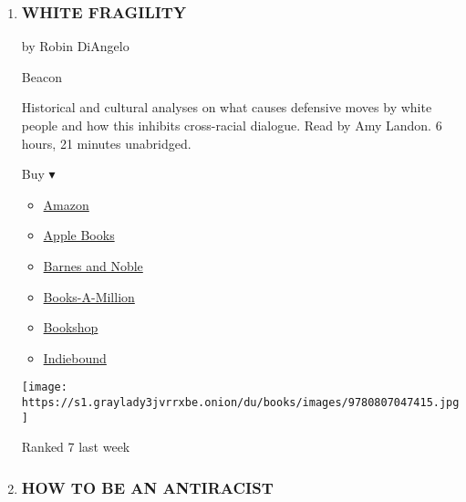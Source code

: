 \begin{enumerate}
\def\labelenumi{\arabic{enumi}.}
\item
  \hypertarget{white-fragility}{%
  \subsubsection{WHITE FRAGILITY}\label{white-fragility}}

  by Robin DiAngelo

  Beacon

  Historical and cultural analyses on what causes defensive moves by
  white people and how this inhibits cross-racial dialogue. Read by Amy
  Landon. 6 hours, 21 minutes unabridged.

  Buy ▾

  \begin{itemize}
  \tightlist
  \item
    \href{https://www.amazon.com/White-Fragility-People-About-Racism/dp/0807047414?tag=NYTBS-20}{Amazon}
  \item
    \href{https://du-gae-books-dot-nyt-du-prd.appspot.com/buy?title=WHITE+FRAGILITY\&author=Robin+DiAngelo}{Apple
    Books}
  \item
    \href{https://www.anrdoezrs.net/click-7990613-11819508?url=https\%3A\%2F\%2Fwww.barnesandnoble.com\%2Fw\%2F\%3Fean\%3D9780807032596}{Barnes
    and Noble}
  \item
    \href{https://www.anrdoezrs.net/click-7990613-35140?url=https\%3A\%2F\%2Fwww.booksamillion.com\%2Fp\%2FWHITE\%2BFRAGILITY\%2FRobin\%2BDiAngelo\%2F9780807032596}{Books-A-Million}
  \item
    \href{https://bookshop.org/a/3546/9780807032596}{Bookshop}
  \item
    \href{https://www.indiebound.org/book/9780807032596?aff=NYT}{Indiebound}
  \end{itemize}

  \texttt{[image: https://s1.graylady3jvrrxbe.onion/du/books/images/9780807047415.jpg]}

  Ranked 7 last week
\item
  \href{https://www.nytimes3xbfgragh.onion/2019/08/20/books/review/how-to-be-an-antiracist-ibram-x-kendi.html}{}

  \hypertarget{how-to-be-an-antiracist}{%
  \subsubsection{HOW TO BE AN
  ANTIRACIST}\label{how-to-be-an-antiracist}}


\end{enumerate}
